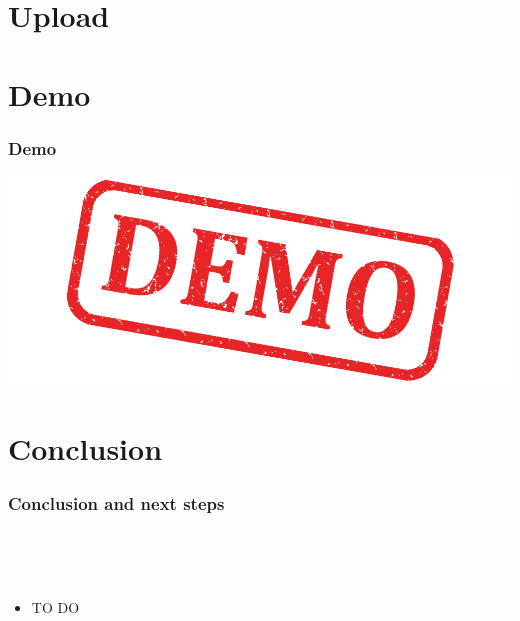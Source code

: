 \section{Upload}

\section{Demo}

\begin{frame}
  \frametitle{Demo}
  \includegraphics[width=\textwidth]{images/demo}
\end{frame}

\section{Conclusion}

\begin{frame}
  \frametitle{Conclusion and next steps}
  \begin{description}[]
    \item[Conclusion] \hfill \\
    \begin{block}{}
    \end{block}
    \item[Next Steps] \hfill \\
      \begin{itemize}
        \item TO DO
      \end{itemize}
  \end{description} 
\end{frame}


